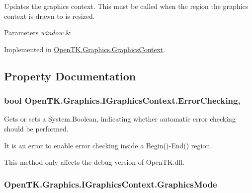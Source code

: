 Updates the graphics context. This must be called when the region the graphics context is drawn to is resized. 


\begin{DoxyParams}{Parameters}
{\em window} & \\
\hline
\end{DoxyParams}


Implemented in \hyperlink{class_open_t_k_1_1_graphics_1_1_graphics_context_a09fa035789147f9b9cfe2a5f09abe927}{Open\-T\-K.\-Graphics.\-Graphics\-Context}.



\subsection{Property Documentation}
\hypertarget{interface_open_t_k_1_1_graphics_1_1_i_graphics_context_ada0d1b90245fbb8eba94ef25072fe49c}{
\subsubsection[{Error\-Checking}]{\setlength{\rightskip}{0pt plus 5cm}bool Open\-T\-K.\-Graphics.\-I\-Graphics\-Context.\-Error\-Checking\hspace{0.3cm}{\ttfamily [get]}, {\ttfamily [set]}}}\label{interface_open_t_k_1_1_graphics_1_1_i_graphics_context_ada0d1b90245fbb8eba94ef25072fe49c}


Gets or sets a System.\-Boolean, indicating whether automatic error checking should be performed. 

It is an error to enable error checking inside a Begin()-\/\-End() region.

This method only affects the debug version of Open\-T\-K.\-dll.\hypertarget{interface_open_t_k_1_1_graphics_1_1_i_graphics_context_a225502437befccb70af6444801d0654e}{
\subsubsection[{Graphics\-Mode}]{ Open\-T\-K.\-Graphics.\-I\-Graphics\-Context.\-Graphics\-Mode\hspace{0.3cm}{\ttfamily [get]}}}\label{interface_open_t_k_1_1_graphics_1_1_i_graphics_context_a225502437befccb70af6444801d0654e}


